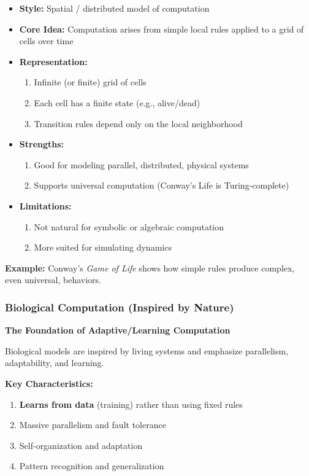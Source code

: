 \begin{itemize}
\item \textbf{Style:} Spatial / distributed model of computation
\item \textbf{Core Idea:} Computation arises from simple local rules applied to a grid of cells over time
\item \textbf{Representation:}
\begin{enumerate}
\item Infinite (or finite) grid of cells
\item Each cell has a finite state (e.g., alive/dead)
\item Transition rules depend only on the local neighborhood
\end{enumerate}
\item \textbf{Strengths:}
\begin{enumerate}
\item Good for modeling parallel, distributed, physical systems
\item Supports universal computation (Conway's Life is Turing-complete)
\end{enumerate}
\item \textbf{Limitations:}
\begin{enumerate}
\item Not natural for symbolic or algebraic computation
\item More suited for simulating dynamics
\end{enumerate}
\end{itemize}

\textbf{Example:} Conway's \textit{Game of Life} shows how simple rules produce complex, even universal, behaviors.

\subsubsection{Biological Computation (Inspired by Nature)}
\label{subsubsec:biological-computation}

\textbf{The Foundation of Adaptive/Learning Computation}

Biological models are inspired by living systems and emphasize parallelism, adaptability, and learning.

\textbf{Key Characteristics:}

\begin{enumerate}
\item \textbf{Learns from data} (training) rather than using fixed rules
\item Massive parallelism and fault tolerance
\item Self-organization and adaptation
\item Pattern recognition and generalization
\end{enumerate}

